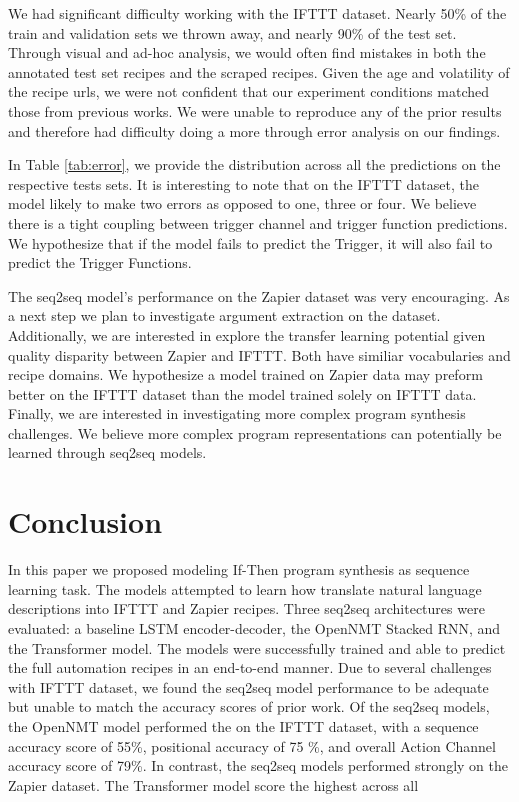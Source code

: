 \documentclass[letterpaper]{article} %
\begin{document}
We had significant difficulty working with the IFTTT dataset. Nearly 50\% of the train and validation sets we thrown away, and nearly 90\% of the test set. Through visual and ad-hoc analysis, we would often find mistakes in both the annotated test set recipes and the scraped recipes. Given the age and volatility of the recipe urls, we were not confident that our experiment conditions matched those from previous works. We were unable to reproduce any of the prior results and therefore had difficulty doing a more through error analysis on our findings.

In Table \ref{tab:error}, we provide the distribution across all the predictions on the respective tests sets. It is interesting to note that on the IFTTT dataset, the model likely to make two errors as opposed to one, three or four. We believe there is a tight coupling between trigger channel and trigger function predictions. We hypothesize that if the model fails to predict the Trigger, it will also fail to predict the Trigger Functions.

The seq2seq model's performance on the Zapier dataset was very encouraging. As a next step we plan to investigate argument extraction on the dataset. Additionally, we are interested in explore the transfer learning potential given quality disparity between Zapier and IFTTT. Both have similiar vocabularies and recipe domains. We hypothesize a model trained on Zapier data may preform better on the IFTTT dataset than the model trained solely on IFTTT data. Finally, we are interested in investigating more complex program synthesis challenges. We believe more complex program representations can potentially be learned through seq2seq models.


\section{Conclusion}
In this paper we proposed modeling If-Then program synthesis as sequence learning task. The models attempted to learn how translate natural language descriptions into IFTTT and Zapier recipes. Three seq2seq architectures were evaluated: a baseline LSTM encoder-decoder, the OpenNMT Stacked RNN, and the Transformer model. The models were successfully trained and able to predict the full automation recipes in an end-to-end manner. Due to several challenges with IFTTT dataset, we found the seq2seq model performance to be adequate but unable to match the accuracy scores of prior work. Of the seq2seq models, the OpenNMT model performed the on the IFTTT dataset, with a sequence accuracy score of 55\%, positional accuracy of 75 \%, and overall Action Channel accuracy score of 79\%. In contrast, the seq2seq models performed strongly on the Zapier dataset. The Transformer model score the highest across all


\clearpage

\end{document}
